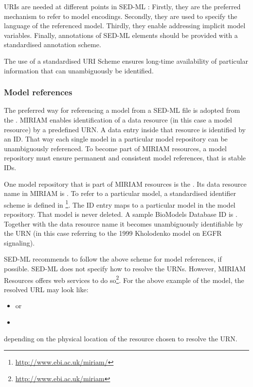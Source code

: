 \label{sec:uriScheme}

URIs are needed at different points in SED-ML \LoneVone: 
Firstly, they are the preferred mechanism to refer to model encodings. 
Secondly, they are used to specify the language of the referenced model.
Thirdly, they enable addressing implicit model variables.
Finally, annotations of SED-ML elements should be provided with a standardised annotation scheme.

The use of a standardised URI Scheme ensures long-time availability  of particular information that can unambiguously be identified. 

\subsubsection{Model references}
\label{sec:modelURI}
The preferred way for referencing a model from a SED-ML file is adopted from the .
MIRIAM enables identification of a data resource (in this case a model resource) by a predefined URN. A data entry inside that resource is identified by an ID. 
That way each single  model  in a particular model repository can be unambiguously referenced. To become part of MIRIAM resources, a model repository must ensure permanent and consistent model references, that is stable IDs.

One model repository that is part of MIRIAM resources is the  \citep{LDR+10}. Its data resource name in MIRIAM is . To refer to a particular model, a standardised identifier scheme is defined in \footnote{\url{http://www.ebi.ac.uk/miriam/}}. The ID entry maps to a particular model in the model repository. That model is never deleted. 
A sample BioModels Database ID is . Together with the data resource name it becomes unambiguously identifiable by the URN  (in this case referring to the 1999 Kholodenko model on EGFR signaling). 
%

SED-ML recommends to follow the above scheme for model references, if possible. 
SED-ML does not specify how to resolve the URNs. However, MIRIAM Resources offers web services to do so\footnote{\url{http://www.ebi.ac.uk/miriam}}. For the above example of the  model, the resolved URL may look like: 
\begin{itemize}
 \item{ or}
 \item{}
\end{itemize}
depending on the physical location of the resource chosen to resolve the URN.

